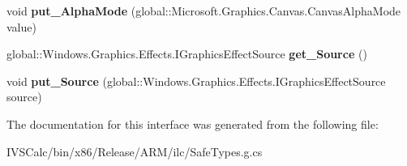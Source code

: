 \begin{DoxyCompactItemize}
\item 
\mbox{\label{interface_microsoft_1_1_graphics_1_1_canvas_1_1_effects_1_1_i_sepia_effect_a28750df56d32d0e2653893f6de5805d7}} 
void {\bfseries put\+\_\+\+Alpha\+Mode} (global\+::\+Microsoft.\+Graphics.\+Canvas.\+Canvas\+Alpha\+Mode value)
\item 
\mbox{\label{interface_microsoft_1_1_graphics_1_1_canvas_1_1_effects_1_1_i_sepia_effect_ac7c0465ec6fc4284a0f0205b572f78a8}} 
global\+::\+Windows.\+Graphics.\+Effects.\+I\+Graphics\+Effect\+Source {\bfseries get\+\_\+\+Source} ()
\item 
\mbox{\label{interface_microsoft_1_1_graphics_1_1_canvas_1_1_effects_1_1_i_sepia_effect_a1673f79e0f93155b9778ad30b74eb86b}} 
void {\bfseries put\+\_\+\+Source} (global\+::\+Windows.\+Graphics.\+Effects.\+I\+Graphics\+Effect\+Source source)
\end{DoxyCompactItemize}


The documentation for this interface was generated from the following file\+:\begin{DoxyCompactItemize}
\item 
I\+V\+S\+Calc/bin/x86/\+Release/\+A\+R\+M/ilc/Safe\+Types.\+g.\+cs\end{DoxyCompactItemize}
